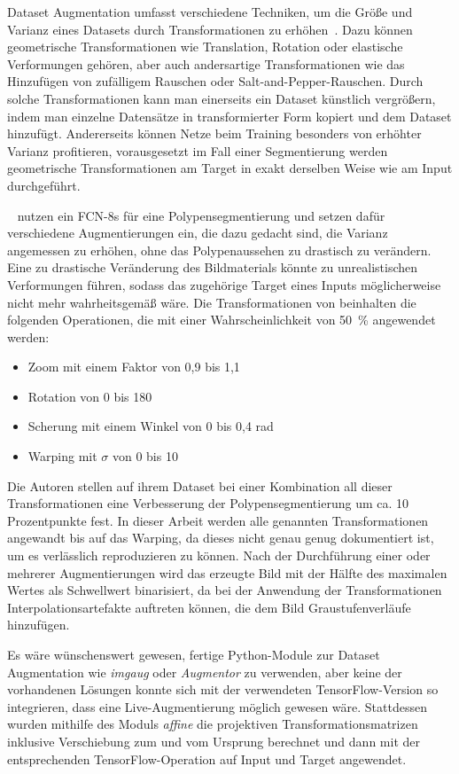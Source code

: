 Dataset Augmentation umfasst verschiedene Techniken, um die Größe und Varianz eines Datasets durch Transformationen zu erhöhen~\cite{Goodfellow.2016}.
Dazu können geometrische Transformationen wie Translation, Rotation oder elastische Verformungen gehören, aber auch andersartige Transformationen wie das Hinzufügen von zufälligem Rauschen oder Salt-and-Pepper-Rauschen.
Durch solche Transformationen kann man einerseits ein Dataset künstlich vergrößern, indem man einzelne Datensätze in transformierter Form kopiert und dem Dataset hinzufügt.
Andererseits können Netze beim Training besonders von erhöhter Varianz profitieren, vorausgesetzt im Fall einer Segmentierung werden geometrische Transformationen am Target in exakt derselben Weise wie am Input durchgeführt.

\citeauthor{Vazquez.2017}~\cite{Vazquez.2017} nutzen ein FCN-8s für eine Polypensegmentierung und setzen dafür verschiedene Augmentierungen ein, die dazu gedacht sind, die Varianz angemessen zu erhöhen, ohne das Polypenaussehen zu drastisch zu verändern.
Eine zu drastische Veränderung des Bildmaterials könnte zu unrealistischen Verformungen führen, sodass das zugehörige Target eines Inputs möglicherweise nicht mehr wahrheitsgemäß wäre.
Die Transformationen von \citeauthor{Vazquez.2017} beinhalten die folgenden Operationen, die mit einer Wahrscheinlichkeit von 50~\% angewendet werden:

\begin{itemize}
	\item Zoom mit einem Faktor von 0,9 bis 1,1
	\item Rotation von 0 bis 180\textdegree
	\item Scherung mit einem Winkel von 0 bis 0,4 rad
	\item Warping mit $ \sigma $ von 0 bis 10
\end{itemize}

Die Autoren stellen auf ihrem Dataset bei einer Kombination all dieser Transformationen eine Verbesserung der Polypensegmentierung um ca. 10 Prozentpunkte fest.
In dieser Arbeit werden alle genannten Transformationen angewandt bis auf das Warping, da dieses nicht genau genug dokumentiert ist, um es verlässlich reproduzieren zu können.
Nach der Durchführung einer oder mehrerer Augmentierungen wird das erzeugte Bild mit der Hälfte des maximalen Wertes als Schwellwert binarisiert, da bei der Anwendung der Transformationen Interpolationsartefakte auftreten können, die dem Bild Graustufenverläufe hinzufügen.

Es wäre wünschenswert gewesen, fertige Python-Module zur Dataset Augmentation wie \emph{imgaug} oder \emph{Augmentor} zu verwenden, aber keine der vorhandenen Lösungen konnte sich mit der verwendeten TensorFlow-Version so integrieren, dass eine Live-Augmentierung möglich gewesen wäre.
Stattdessen wurden mithilfe des Moduls \emph{affine} die projektiven Transformationsmatrizen inklusive Verschiebung zum und vom Ursprung berechnet und dann mit der entsprechenden TensorFlow-Operation auf Input und Target angewendet.



